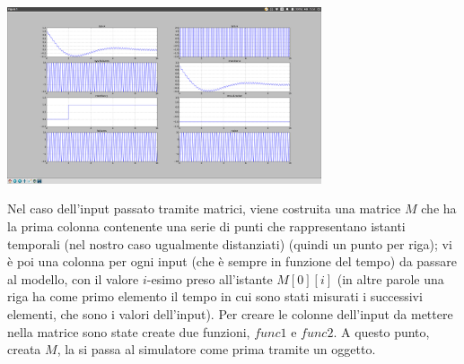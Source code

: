 \documentclass[a4paper, 11pt]{article}
\begin{document}
\begin{center}
 \includegraphics[width=350px]{png/00-loadbalancer.png}
\end{center}

Nel caso dell'input passato tramite matrici, viene costruita una matrice $M$ che ha la prima colonna contenente una serie di punti che rappresentano istanti temporali (nel nostro caso ugualmente distanziati) (quindi un punto per riga); vi è poi una colonna per ogni input (che è sempre in funzione del tempo) da passare al modello, con il valore $i$-esimo preso all'istante $M[0][i]$ (in altre parole una riga ha come primo elemento il tempo in cui sono stati misurati i successivi elementi, che sono i valori dell'input). Per creare le colonne dell'input da mettere nella matrice sono state create due funzioni, $func1$ e $func2$. A questo punto, creata $M$, la si passa al simulatore come prima tramite un oggetto.\\
\end{document}
